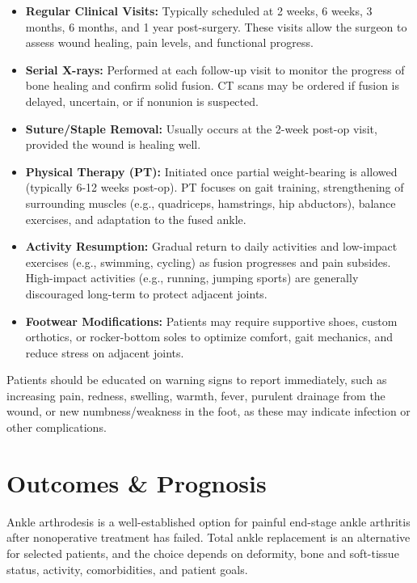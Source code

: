 \begin{itemize}
  \item \textbf{Regular Clinical Visits:} Typically scheduled at 2 weeks, 6 weeks, 3 months, 6 months, and 1 year post-surgery. These visits allow the surgeon to assess wound healing, pain levels, and functional progress.
  
  \item \textbf{Serial X-rays:} Performed at each follow-up visit to monitor the progress of bone healing and confirm solid fusion. CT scans may be ordered if fusion is delayed, uncertain, or if nonunion is suspected.
  
  \item \textbf{Suture/Staple Removal:} Usually occurs at the 2-week post-op visit, provided the wound is healing well.
  
  \item \textbf{Physical Therapy (PT):} Initiated once partial weight-bearing is allowed (typically 6-12 weeks post-op). PT focuses on gait training, strengthening of surrounding muscles (e.g., quadriceps, hamstrings, hip abductors), balance exercises, and adaptation to the fused ankle.
  
  \item \textbf{Activity Resumption:} Gradual return to daily activities and low-impact exercises (e.g., swimming, cycling) as fusion progresses and pain subsides. High-impact activities (e.g., running, jumping sports) are generally discouraged long-term to protect adjacent joints.
  
  \item \textbf{Footwear Modifications:} Patients may require supportive shoes, custom orthotics, or rocker-bottom soles to optimize comfort, gait mechanics, and reduce stress on adjacent joints.
\end{itemize}

Patients should be educated on warning signs to report immediately, such as increasing pain, redness, swelling, warmth, fever, purulent drainage from the wound, or new numbness/weakness in the foot, as these may indicate infection or other complications.

\section*{Outcomes \& Prognosis}
Ankle arthrodesis is a well-established option for painful end-stage ankle arthritis after nonoperative treatment has failed. Total ankle replacement is an alternative for selected patients, and the choice depends on deformity, bone and soft-tissue status, activity, comorbidities, and patient goals.

